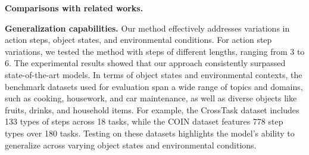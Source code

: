 \textbf{Comparisons with related works.}%

\textbf{Generalization capabilities.} Our method effectively addresses variations in action steps, object states, and environmental conditions. For action step variations, we tested the method with steps of different lengths, ranging from 3 to 6. The experimental results showed that our approach consistently surpassed state-of-the-art models. In terms of object states and environmental contexts, the benchmark datasets used for evaluation span a wide range of topics and domains, such as cooking, housework, and car maintenance, as well as diverse objects like fruits, drinks, and household items. For example, the CrossTask dataset includes 133 types of steps across 18 tasks, while the COIN dataset features 778 step types over 180 tasks. Testing on these datasets highlights the model's ability to generalize across varying object states and environmental conditions.